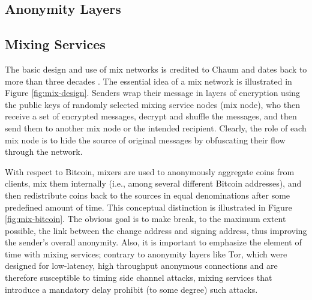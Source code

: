 \subsection{Anonymity Layers}

\subsection{Mixing Services}
The basic design and use of mix networks is credited to Chaum and dates back to more than three decades \cite{Chaum81-Mix}. The essential idea of a mix network is illustrated in Figure \ref{fig:mix-design}. Senders wrap their message in layers of encryption using the public keys of randomly selected mixing service nodes (mix node), who then receive a set of encrypted messages, decrypt and shuffle the messages, and then send them to another mix node or the intended recipient. Clearly, the role of each mix node is to hide the source of original messages by obfuscating their flow through the network. 




With respect to Bitcoin, mixers are used to anonymously aggregate coins from clients, mix them internally (i.e., among several different Bitcoin addresses), and then redistribute coins back to the sources in equal denominations after some predefined amount of time. This conceptual distinction is illustrated in Figure \ref{fig:mix-bitcoin}. The obvious goal is to make break, to the maximum extent possible, the link between the change address and signing address, thus improving the sender's overall anonymity. Also, it is important to emphasize the element of time with mixing services; contrary to anonymity layers like Tor, which were designed for low-latency, high throughput anonymous connections and are therefore susceptible to timing side channel attacks, mixing services that introduce a mandatory delay prohibit (to some degree) such attacks.

